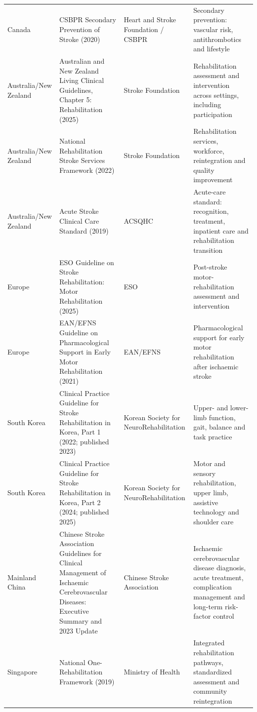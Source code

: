 \begin{landscape}
\begin{longtable}{@{}
>{\RaggedRight\arraybackslash}p{2.10cm}
>{\RaggedRight\arraybackslash}p{8.70cm}
>{\RaggedRight\arraybackslash}p{4.20cm}
>{\RaggedRight\arraybackslash}p{8.70cm}
@{}}
Canada & CSBPR Secondary Prevention of Stroke (2020) \cite{S1CSBPR2020SecondaryPrevention} & Heart and Stroke Foundation / CSBPR & Secondary prevention: vascular risk, antithrombotics and lifestyle \\
Australia/New Zealand & Australian and New Zealand Living Clinical Guidelines, Chapter 5: Rehabilitation (2025) \cite{S1StrokeFoundationLivingGuidelineRehab} & Stroke Foundation & Rehabilitation assessment and intervention across settings, including participation \\
Australia/New Zealand & National Rehabilitation Stroke Services Framework (2022) \cite{S1StrokeFoundation2022RehabFramework} & Stroke Foundation & Rehabilitation services, workforce, reintegration and quality improvement \\
Australia/New Zealand & Acute Stroke Clinical Care Standard (2019) \cite{S1ACSQHC2019AcuteStrokeStandard} & ACSQHC & Acute-care standard: recognition, treatment, inpatient care and rehabilitation transition \\
Europe & ESO Guideline on Stroke Rehabilitation: Motor Rehabilitation (2025) \cite{S1AltMurphy2025ESOMotorRehab} & ESO & Post-stroke motor-rehabilitation assessment and intervention \\
Europe & EAN/EFNS Guideline on Pharmacological Support in Early Motor Rehabilitation (2021) \cite{S1Beghi2021EANEFNSPharmacological} & EAN/EFNS & Pharmacological support for early motor rehabilitation after ischaemic stroke \\
South Korea & Clinical Practice Guideline for Stroke Rehabilitation in Korea, Part 1 (2022; published 2023) \cite{S1Korea2022Part1} & Korean Society for NeuroRehabilitation & Upper- and lower-limb function, gait, balance and task practice \\
South Korea & Clinical Practice Guideline for Stroke Rehabilitation in Korea, Part 2 (2024; published 2025) \cite{S1Lee2025KoreaPart2} & Korean Society for NeuroRehabilitation & Motor and sensory rehabilitation, upper limb, assistive technology and shoulder care \\
Mainland China & Chinese Stroke Association Guidelines for Clinical Management of Ischaemic Cerebrovascular Diseases: Executive Summary and 2023 Update \cite{S1Liu2023CSAIschaemicUpdate} & Chinese Stroke Association & Ischaemic cerebrovascular disease diagnosis, acute treatment, complication management and long-term risk-factor control \\
Singapore & National One-Rehabilitation Framework (2019) \cite{S1MOH2019OneRehabFramework} & Ministry of Health & Integrated rehabilitation pathways, standardized assessment and community reintegration \\

\end{longtable}
\end{landscape}
